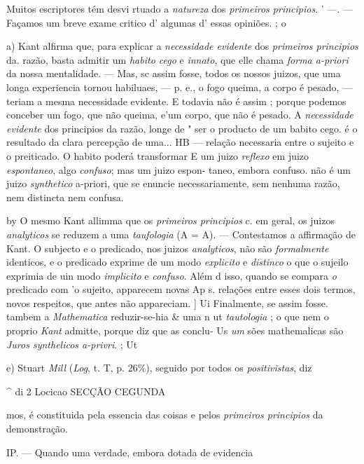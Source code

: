 Muitos escriptores tém desvi rtuado a \emph{natureza} dos \emph{primeiros principios}. ' ---. --- Façamos um breve exame critico d' algumas d' essas opiniões. ; \textbar{} o

a) Kant alfirma que, para explicar a \emph{necessidade evidente} dos \emph{primeiros principios} da. razão, basta admitir um \emph{habito cego} e \emph{innato}, que elle chama \emph{forma a-priori} da nossa mentalidade. --- Mas, sc assim fosse, todos os nossos juizos, que uma longa experiencia tornou habiluaes, --- p. e., o fogo queima, a corpo é pesado, --- teriam a mesma necessidade evidente. E todavia não é assim ; porque podemos conceber um fogo, que não queima, e'um corpo, que não é pesado. A \emph{necessidade evidente} dos principios da razão, longe de " ser o producto de um babito cego. é o resultado da clara percepção de uma... HB --- relação necessaria entre o sujeito e o preiticado. O habito poderá transformar E um juizo \emph{reflexo} em juizo \emph{espontaneo}, algo \emph{confuso}; mas um juizo espon- \textbar{} taneo, embora confuso. não é um juizo \emph{synthetico} a-priori, que se enuncie necessariamente, sem nenhuma razão, nem distincta nem confusa.

by O mesmo Kant allimma que os \emph{primeiros principios} c. em geral, os juizos \emph{analyticos} se reduzem a uma \emph{taufologia} (A = A). --- Contestamos a affirmação de Kant. O subjecto e o predicado, nos juizos \emph{analyticos}, não são \emph{formalmente} identicos, e o predicado exprime de um modo \emph{explicito} e \emph{distinco} o que o sujeilo exprimia de uin modo \emph{implicito} e \emph{confuso}. Além d isso, quando se compara \emph{o} predicado com 'o sujeito, apparecem novas Ap s. relações entre esses dois termos, novos respeitos, que antes não appareciam. ] Ui Finalmente, se assim fosse. tambem a \emph{Mathematica} reduzir-se-hia \& uma n ut \emph{tautologia} ; o que nem o proprio \emph{Kant} admitte, porque diz que as conclu- Us \emph{um} sões mathemalicas são \emph{Juros synthelicos a-privri}. ; Ut

e) Stuart \emph{Mill} (\emph{Log}, t. T, p. 26\%), seguido por todos os \emph{positivistas}, diz

\textasciicircum{}   di 2 Locicao SECÇÃO CEGUNDA

mos, é constituida pela essencia das coisas e pelos \emph{primeiros principios} da demonstração. \textbar{}

IP. --- Quando uma verdade, embora dotada de evidencia

